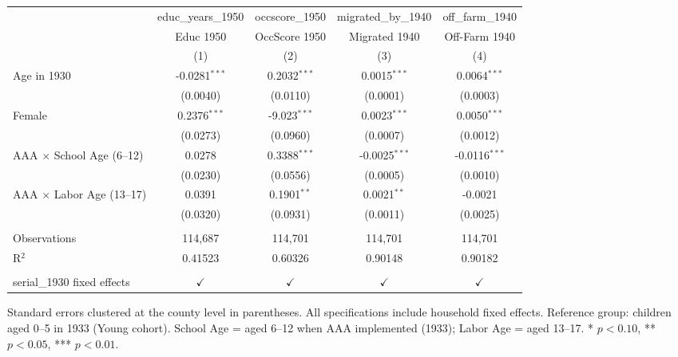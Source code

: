 
\begingroup
\centering
\begin{tabular}{lcccc}
   \toprule
                                    & educ\_years\_1950   & occscore\_1950  & migrated\_by\_1940   & off\_farm\_1940\\    
                                    & Educ 1950           & OccScore 1950   & Migrated 1940        & Off-Farm 1940 \\   
                                    & (1)                 & (2)             & (3)                  & (4)\\  
   \midrule 
   Age in 1930                      & -0.0281$^{***}$     & 0.2032$^{***}$  & 0.0015$^{***}$       & 0.0064$^{***}$\\   
                                    & (0.0040)            & (0.0110)        & (0.0001)             & (0.0003)\\   
   Female                           & 0.2376$^{***}$      & -9.023$^{***}$  & 0.0023$^{***}$       & 0.0050$^{***}$\\   
                                    & (0.0273)            & (0.0960)        & (0.0007)             & (0.0012)\\   
   AAA $\times$ School Age (6--12)  & 0.0278              & 0.3388$^{***}$  & -0.0025$^{***}$      & -0.0116$^{***}$\\   
                                    & (0.0230)            & (0.0556)        & (0.0005)             & (0.0010)\\   
   AAA $\times$ Labor Age (13--17)  & 0.0391              & 0.1901$^{**}$   & 0.0021$^{**}$        & -0.0021\\   
                                    & (0.0320)            & (0.0931)        & (0.0011)             & (0.0025)\\   
    \\
   Observations                     & 114,687             & 114,701         & 114,701              & 114,701\\  
   R$^2$                            & 0.41523             & 0.60326         & 0.90148              & 0.90182\\  
    \\
   serial\_1930 fixed effects       & $\checkmark$        & $\checkmark$    & $\checkmark$         & $\checkmark$\\   
   \bottomrule
\end{tabular}
 
\par \raggedright 
Standard errors clustered at the county level in parentheses. All specifications include household fixed effects. Reference group: children aged 0--5 in 1933 (Young cohort). School Age = aged 6--12 when AAA implemented (1933); Labor Age = aged 13--17. * $p<0.10$, ** $p<0.05$, *** $p<0.01$.
\par\endgroup


